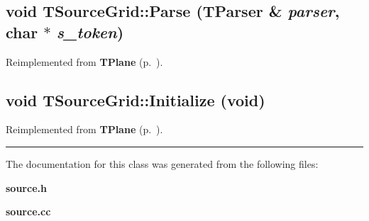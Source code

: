 \subsection{\setlength{\rightskip}{0pt plus 5cm}void TSource\-Grid::Parse ({\bf TParser} \& {\em parser}, char $\ast$ {\em s\_\-token})\hspace{0.3cm}{\tt  [virtual]}}



Reimplemented from {\bf TPlane} {\rm (p.~\pageref{TPlane_a2})}.\label{TSourceGrid_a2}
\subsection{\setlength{\rightskip}{0pt plus 5cm}void TSource\-Grid::Initialize (void)\hspace{0.3cm}{\tt  [virtual]}}



Reimplemented from {\bf TPlane} {\rm (p.~\pageref{TPlane_a3})}.\vspace{0.4cm}\hrule\vspace{0.2cm}
The documentation for this class was generated from the following files:\begin{CompactItemize}
\item 
{\bf source.h}\item 
{\bf source.cc}\end{CompactItemize}
